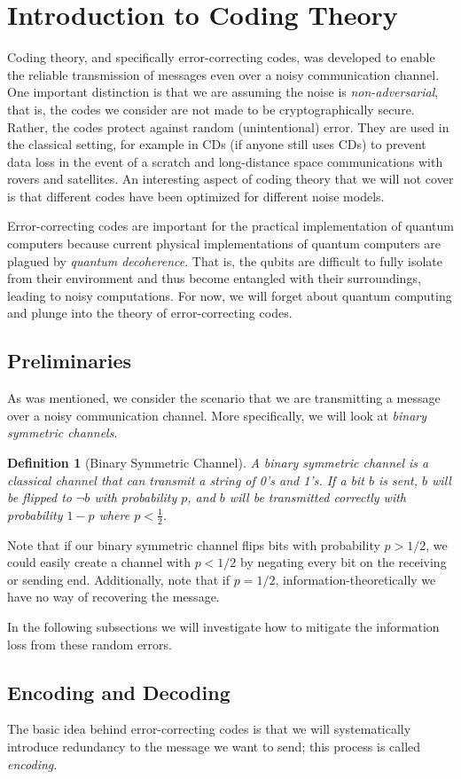 \documentclass[12pt]{article}
\author{Marika Swanberg}
\newtheorem{definition}{Definition}
\begin{document}
\section{Introduction to Coding Theory} 

Coding theory, and specifically error-correcting codes, was developed to enable the reliable transmission of messages even over a noisy communication channel. One important distinction is that we are assuming the noise is \textit{non-adversarial}, that is, the codes we consider are not made to be cryptographically secure. Rather, the codes protect against random (unintentional) error. They are used in the classical setting, for example in CDs (if anyone still uses CDs) to prevent data loss in the event of a scratch and long-distance space communications with rovers and satellites. An interesting aspect of coding theory that we will not cover is that different codes have been optimized for different noise models.

Error-correcting codes are important for the practical implementation of quantum computers because current physical implementations of quantum computers are plagued by \textit{quantum decoherence}. That is, the qubits are difficult to fully isolate from their environment and thus become entangled with their surroundings, leading to noisy computations. For now, we will forget about quantum computing and plunge into the theory of error-correcting codes.

\subsection{Preliminaries}
As was mentioned, we consider the scenario that we are transmitting a message over a noisy communication channel. More specifically, we will look at \textit{binary symmetric channels}.

\begin{definition}[Binary Symmetric Channel] A binary symmetric channel is a classical channel that can transmit a string of 0's and 1's. If a bit $b$ is sent, $b$ will be flipped to $\lnot b$ with probability $p$, and $b$ will be transmitted correctly with probability $1-p$ where $p < \frac{1}{2}$.
\end{definition}

Note that if our binary symmetric channel flips bits with probability $p > 1/2$, we could easily create a channel with $p <1/2$ by negating every bit on the receiving or sending end. Additionally, note that if $p=1/2$, information-theoretically we have no way of recovering the message.

In the following subsections we will investigate how to mitigate the information loss from these random errors.

\subsection{Encoding and Decoding}
The basic idea behind error-correcting codes is that we will systematically introduce redundancy to the message we want to send; this process is called \textit{encoding}.
\end{document}
